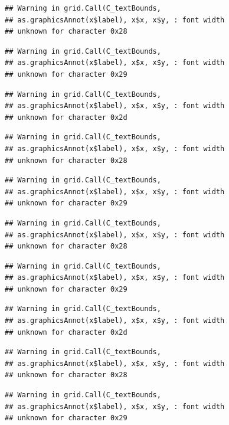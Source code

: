 \documentclass[
]{book}
\begin{document}
\begin{verbatim}
## Warning in grid.Call(C_textBounds,
## as.graphicsAnnot(x$label), x$x, x$y, : font width
## unknown for character 0x28
\end{verbatim}

\begin{verbatim}
## Warning in grid.Call(C_textBounds,
## as.graphicsAnnot(x$label), x$x, x$y, : font width
## unknown for character 0x29
\end{verbatim}

\begin{verbatim}
## Warning in grid.Call(C_textBounds,
## as.graphicsAnnot(x$label), x$x, x$y, : font width
## unknown for character 0x2d
\end{verbatim}

\begin{verbatim}
## Warning in grid.Call(C_textBounds,
## as.graphicsAnnot(x$label), x$x, x$y, : font width
## unknown for character 0x28
\end{verbatim}

\begin{verbatim}
## Warning in grid.Call(C_textBounds,
## as.graphicsAnnot(x$label), x$x, x$y, : font width
## unknown for character 0x29
\end{verbatim}

\begin{verbatim}
## Warning in grid.Call(C_textBounds,
## as.graphicsAnnot(x$label), x$x, x$y, : font width
## unknown for character 0x28
\end{verbatim}

\begin{verbatim}
## Warning in grid.Call(C_textBounds,
## as.graphicsAnnot(x$label), x$x, x$y, : font width
## unknown for character 0x29
\end{verbatim}

\begin{verbatim}
## Warning in grid.Call(C_textBounds,
## as.graphicsAnnot(x$label), x$x, x$y, : font width
## unknown for character 0x2d
\end{verbatim}

\begin{verbatim}
## Warning in grid.Call(C_textBounds,
## as.graphicsAnnot(x$label), x$x, x$y, : font width
## unknown for character 0x28
\end{verbatim}

\begin{verbatim}
## Warning in grid.Call(C_textBounds,
## as.graphicsAnnot(x$label), x$x, x$y, : font width
## unknown for character 0x29
\end{verbatim}
\end{document}
